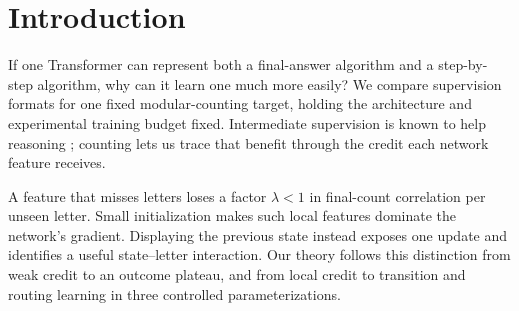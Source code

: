 \begin{abstract}
A Transformer can represent a counting algorithm yet struggle to learn it from final answers.
We explain how running-count supervision changes the gradient signal. Each unseen letter contracts
a feature's correlation with the final count, while small initialization favors features that read
few letters. In a two-block Transformer containing exact solutions for both formats, outcome
cross-entropy gradient flow from a zero readout therefore stays near chance for exponential time.
Displayed states expose a local innovation: rule credit is generically nonzero and has a quantitative
Gaussian lower bound under a quantitative geometric initialization event. Structured joint gradient
flow learns transitions in polynomial time, suppresses clean distractors, and, in a separate tied
feature model, learns the current-letter relative offset. The positive results retain specified
feature roles and training metrics. Experiments support the mechanism beyond these assumptions,
including LoRA-tuned object tracking, but a five-object reversal shows its empirical limits.
\end{abstract}

\section{Introduction}
\label{sec:intro}

If one Transformer can represent both a final-answer algorithm and a step-by-step algorithm,
why can it learn one much more easily? We compare supervision formats for one fixed modular-counting
target, holding the architecture and experimental training budget fixed. Intermediate supervision
is known to help reasoning \citep{nye2021scratchpads,wei2022cot,lightman2023verify}; counting lets us
trace that benefit through the credit each network feature receives.

A feature that misses letters loses a factor $\lambda<1$ in final-count correlation per unseen letter.
Small initialization makes such local features dominate the network's gradient. Displaying the
previous state instead exposes one update and identifies a useful state--letter interaction.
Our theory follows this distinction from weak credit to an outcome plateau, and from local credit
to transition and routing learning in three controlled parameterizations.

